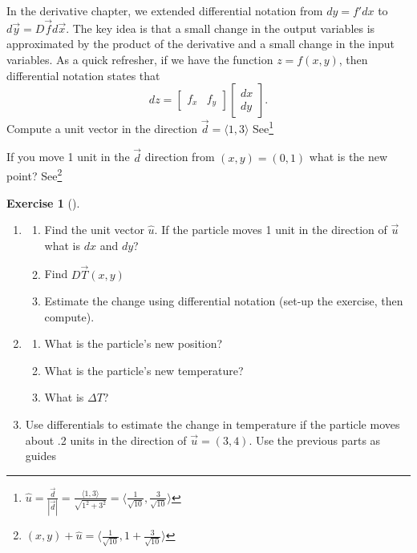 \documentclass[10pt,]{book}
\theoremstyle{plain}
\theoremstyle{definition}
\theoremstyle{definition}
\theoremstyle{definition}
\theoremstyle{definition}
\newtheorem{exploration}[project]{Exercise}
\theoremstyle{definition}
\numberwithin{equation}{section}
\newcommand{\amp}{&}
\begin{document}
In the derivative chapter, we extended differential notation from \(dy=f' dx\) to \(d\vec y = D\vec f d\vec x\). The key idea is that a small change in the output variables is approximated by the product of the derivative and a small change in the input variables. As a quick refresher, if we have the function \(z=f(x,y)\), then differential notation states that%
\begin{equation*}
dz = \begin{bmatrix}f_x\amp f_y
\end{bmatrix}  \begin{bmatrix}dx\\dy
\end{bmatrix} .
\end{equation*}
%
Compute a unit vector in the direction \(\vec{d}=\langle 1,3 \rangle\) See\footnote{\(\hat{u}=\frac{\vec{d}}{|\vec{d}|}=\frac{\langle 1,3 \rangle}{\sqrt{1^2+3^2}}=\langle \frac{1}{\sqrt{10}}, \frac{3}{\sqrt{10}} \rangle\)\label{fn-21}}%
 \par
If you move 1 unit in the \(\vec{d}\) direction from \((x,y)=(0,1)\) what is the new point? See\footnote{\((x,y)+\hat{u}=\langle \frac{1}{\sqrt{10}}, 1+\frac{3}{\sqrt{10}} \rangle\)\label{fn-22}}%
\begin{exploration}[]\label{exploration-226}
\leavevmode%
\begin{enumerate}[font=\bfseries,label=(\alph*),ref=\alph*]
\item\label{task-593} \begin{enumerate}[font=\bfseries,label=(\roman*),ref=\theenumi.\roman*]
\item\label{task-594} Find the unit vector \(\hat{u}\). If the particle moves 1 unit in the direction of \(\vec{u}\) what is \(dx\) and \(dy\)?%
\item\label{task-595} Find \(D\vec{T}(x,y)\)%
\item\label{task-596} Estimate the change using differential notation (set-up the exercise, then compute).%
\end{enumerate}
\item\label{task-597} \begin{enumerate}[font=\bfseries,label=(\roman*),ref=\theenumi.\roman*]
\item\label{task-598} What is the particle's new position?%
\item\label{task-599} What is the particle's new temperature?%
\item\label{task-600} What is \(\Delta T\)?%
\end{enumerate}
\item\label{task-601} Use differentials to estimate the change in temperature if the particle moves about .2 units in the direction of \(\vec u=\left(3,4\right)\). Use the previous parts as guides%
%
\end{enumerate}
\end{exploration}
\end{document}
